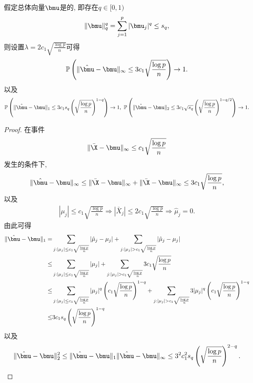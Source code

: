 \begin{prop}[渐近稀疏均值估计]
	假定总体向量$\bmu$是的, 即存在$q \in [0,1)$
	\begin{align*}
		\|\bmu\|^q_q =\sum_{j=1}^p |\bmu_j|^q \leq s_q,
	\end{align*}	
	则设置$\lambda=2c_1\sqrt{\frac{\log p}{n}}$可得
	\begin{align*}
		\Pr\left(\|\hat{\bmu}-\bmu\|_\infty\leq 3c_1\sqrt{\frac{\log p}{n}}\right) \to 1.
	\end{align*}
	以及
	\begin{align*}
		\Pr\left(\|\hat{\bmu}-\bmu\|_1 \leq 3 c_1 s_q \left(\sqrt{\frac{\log p}{n}} \right)^{1-q} \right) \to 1,~\Pr\left(\|\hat{\bmu}-\bmu\|_2 \leq 3c_1 \sqrt{s_q} \left(\sqrt{\frac{\log p}{n}} \right)^{1-q/2}\right) \to 1.
	\end{align*}
	\end{prop}
\begin{proof}
	在事件
	\begin{align*}
		\|\bar{\X}-\bmu\|_\infty \leq  c_1 \sqrt{\frac{\log p}{n}}
	\end{align*}	
	发生的条件下, 
	\begin{align*}
		\|\hat{\bmu}-\bmu\|_\infty \leq \|\bar{\X}-\bmu\|_\infty+\|\bar{\X}-\bmu\|_\infty \leq 3 c_1 \sqrt{\frac{\log p}{n}},
	\end{align*}
以及
\begin{align*}
	|\mu_j|\leq c_1 \sqrt{\frac{\log p}{n}} \Rightarrow |\bar{X}_j| \leq 2 c_1 \sqrt{\frac{\log p}{n}} \Rightarrow \hat{\mu}_j=0.
\end{align*}
由此可得
\begin{align*}
	\|\hat{\bmu}-\bmu\|_1=&\sum_{j: |\mu_j|\leq c_1 \sqrt{\frac{\log p}{n}} } |\hat{\mu}_j-\mu_j|+\sum_{j: |\mu_j|>c_1 \sqrt{\frac{\log p}{n}} } |\hat{\mu}_j-\mu_j|\\
\leq & \sum_{j: |\mu_j|\leq c_1 \sqrt{\frac{\log p}{n}} } |\mu_j|+\sum_{j: |\mu_j|>c_1 \sqrt{\frac{\log p}{n}} } 3 c_1 \sqrt{\frac{\log p}{n}}\\
\leq & \sum_{j: |\mu_j|\leq c_1 \sqrt{\frac{\log p}{n}} } |\mu_j|^q \left(c_1 \sqrt{\frac{\log p}{n}} \right)^{1-q}+\sum_{j: |\mu_j|>c_1 \sqrt{\frac{\log p}{n}} } 3 |\mu_j|^q \left(c_1\sqrt{\frac{\log p}{n}} \right)^{1-q}\\
\leq & 3c_1 s_q \left(\sqrt{\frac{\log p}{n}} \right)^{1-q}
\end{align*}
以及
\begin{align*}
	\|\hat{\bmu}-\bmu\|^2_2 \leq \|\hat{\bmu}-\bmu\|_1 \|\hat{\bmu}-\bmu\|_\infty \leq 3^2c^2_1 s_q \left(\sqrt{\frac{\log p}{n}} \right)^{2-q}. 
\end{align*}
\end{proof}

